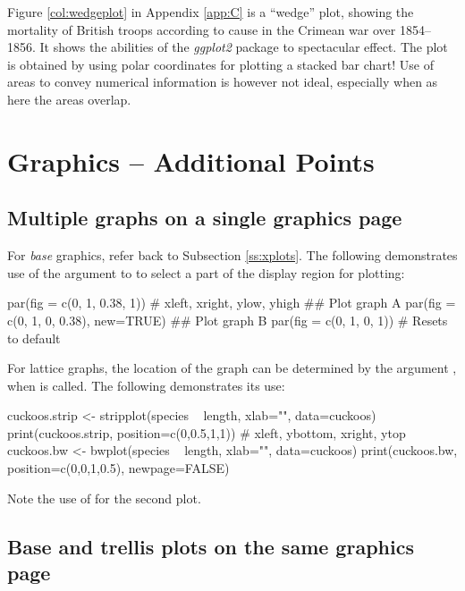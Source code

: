 Figure \ref{col:wedgeplot} in Appendix \ref{app:C} is a ``wedge''
plot, showing the mortality of British troops according to cause in
the Crimean war over 1854--1856. It shows the abilities of the {\em
  ggplot2} package to spectacular effect.  The plot is obtained by
using polar coordinates for plotting a stacked bar chart!  Use of
areas to convey numerical information is however not ideal, especially
when as here the areas overlap.


\section{Graphics -- Additional Points}
\subsection{Multiple graphs on a single graphics page}\label{ssec:xgph}

For \textit{base} graphics, refer back to Subsection \ref{ss:xplots}.
The following demonstrates use of the 
argument to  to select a part of the display region
for plotting:
\begin{Schunk}
\begin{Sinput}
par(fig = c(0, 1, 0.38, 1))
          # xleft, xright, ylow, yhigh
## Plot graph A
par(fig = c(0, 1, 0, 0.38), new=TRUE)
## Plot graph B
par(fig = c(0, 1, 0, 1))     # Resets to default
\end{Sinput}
\end{Schunk}
For lattice graphs, the location of the graph can be determined
by the argument , when  is called.
The following demonstrates its use:
\begin{fullwidth}
\begin{Schunk}
\begin{Sinput}
cuckoos.strip <- stripplot(species ~ length, xlab="", data=cuckoos)
print(cuckoos.strip, position=c(0,0.5,1,1))
                   # xleft, ybottom, xright, ytop
cuckoos.bw <- bwplot(species ~ length, xlab="", data=cuckoos)
print(cuckoos.bw, position=c(0,0,1,0.5), newpage=FALSE)
\end{Sinput}
\end{Schunk}
\end{fullwidth}
\noindent
Note the use of  for the second plot.

\subsection*{Base and trellis plots on the same graphics page}


